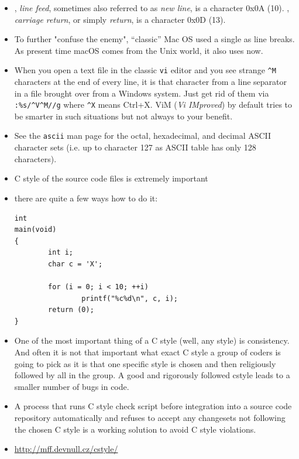 
\begin{itemize}
\item {}, \emph{line feed}, sometimes also referred to as \emph{new
line}, is a character 0x0A (10).  , \emph{carriage return}, or simply
\emph{return}, is a character 0x0D (13).
\item To further "confuse the enemy", ``classic'' Mac OS used a single 
as line breaks.  As present time macOS comes from the Unix world, it also uses
 now.
\item When you open a text file in the classic \texttt{vi} editor and you see
strange \verb|^M| characters at the end of every line, it is that 
character from a line separator in a file brought over from a Windows system.
Just get rid of them via \verb|:%s/^V^M//g| where \verb|^X| means Ctrl+X.
ViM (\emph{Vi IMproved}) by default tries to be smarter in such situations but
not always to your benefit.
\item See the \texttt{ascii} man page for the octal, hexadecimal, and decimal
ASCII character sets (i.e. up to character 127 as ASCII table has only 128
characters).
\end{itemize}



\begin{slide}
\begin{itemize}
\item C style of the source code files is extremely important
\item there are quite a few ways how to do it:

\begin{verbatim}
int
main(void)
{
        int i;
        char c = 'X';

        for (i = 0; i < 10; ++i)
                printf("%c%d\n", c, i);
        return (0);
}
\end{verbatim}
\end{itemize}
\end{slide}

\begin{itemize}
\item One of the most important thing of a C style (well, any style) is
consistency.  And often it is not that important what exact C style a group
of coders is going to pick as it is that one specific style is chosen and then
religiously followed by all in the group. A good and rigorously followed cstyle
leads to a smaller number of bugs in code.
\item A process that runs C style check script before integration into a source
code repository automatically and refuses to accept any changesets not following
the chosen C style is a working solution to avoid C style violations.
\item \url{http://mff.devnull.cz/cstyle/}
\end{itemize}

